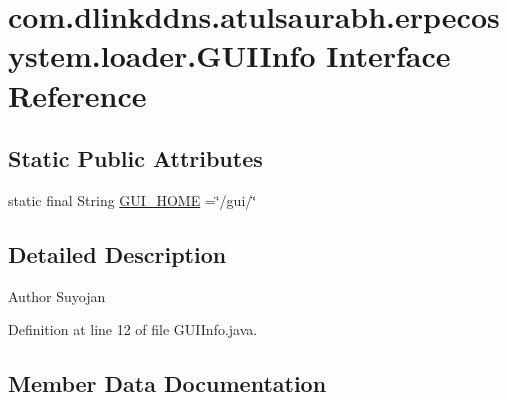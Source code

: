 \hypertarget{interfacecom_1_1dlinkddns_1_1atulsaurabh_1_1erpecosystem_1_1loader_1_1_g_u_i_info}{}\section{com.\+dlinkddns.\+atulsaurabh.\+erpecosystem.\+loader.\+G\+U\+I\+Info Interface Reference}
\label{interfacecom_1_1dlinkddns_1_1atulsaurabh_1_1erpecosystem_1_1loader_1_1_g_u_i_info}
\subsection*{Static Public Attributes}
\begin{DoxyCompactItemize}
\item 
static final String \mbox{\hyperlink{interfacecom_1_1dlinkddns_1_1atulsaurabh_1_1erpecosystem_1_1loader_1_1_g_u_i_info_a9357425e3de4062e155fe1fff7f920be}{G\+U\+I\+\_\+\+H\+O\+ME}} =\char`\"{}/gui/\char`\"{}
\end{DoxyCompactItemize}


\subsection{Detailed Description}
\begin{DoxyAuthor}{Author}
Suyojan 
\end{DoxyAuthor}


Definition at line 12 of file G\+U\+I\+Info.\+java.



\subsection{Member Data Documentation}
\mbox{\label{interfacecom_1_1dlinkddns_1_1atulsaurabh_1_1erpecosystem_1_1loader_1_1_g_u_i_info_a9357425e3de4062e155fe1fff7f920be}} 
